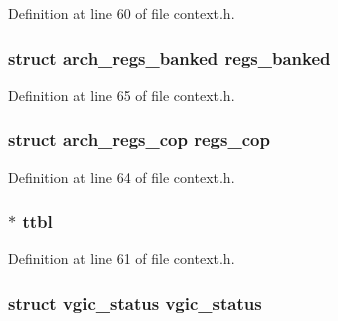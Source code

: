 \-Definition at line 60 of file context.\-h.

\hypertarget{structhyp__guest__context_a16825e70a665e6368fce044d9f1fdb07}{
\subsubsection[{regs\-\_\-banked}]{\setlength{\rightskip}{0pt plus 5cm}struct {\bf arch\-\_\-regs\-\_\-banked} {\bf regs\-\_\-banked}}}\label{structhyp__guest__context_a16825e70a665e6368fce044d9f1fdb07}


\-Definition at line 65 of file context.\-h.

\hypertarget{structhyp__guest__context_a216fdbbf2a31b2bef63e2c013f25ce51}{
\subsubsection[{regs\-\_\-cop}]{\setlength{\rightskip}{0pt plus 5cm}struct {\bf arch\-\_\-regs\-\_\-cop} {\bf regs\-\_\-cop}}}\label{structhyp__guest__context_a216fdbbf2a31b2bef63e2c013f25ce51}


\-Definition at line 64 of file context.\-h.

\hypertarget{structhyp__guest__context_af96dd8c0db5b16addac6cbaa292894d1}{
\subsubsection[{ttbl}]{$\ast$ {\bf ttbl}}}\label{structhyp__guest__context_af96dd8c0db5b16addac6cbaa292894d1}


\-Definition at line 61 of file context.\-h.

\hypertarget{structhyp__guest__context_aaf1e3e694ca7bf2cbda2d9817f3e9389}{
\subsubsection[{vgic\-\_\-status}]{\setlength{\rightskip}{0pt plus 5cm}struct {\bf vgic\-\_\-status} {\bf vgic\-\_\-status}}}\label{structhyp__guest__context_aaf1e3e694ca7bf2cbda2d9817f3e9389}


